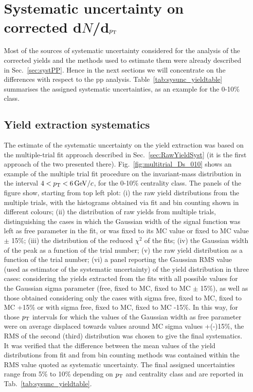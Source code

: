 \section{Systematic uncertainty on corrected d$N$/d$p_{\rm T}$}
\label{sec:systematics}
Most of the sources of systematic uncertainty considered for the analysis 
of the corrected yields and the methods used to estimate them were already described in Sec.~\ref{sec:systPP}. 
Hence in the next sections we will concentrate on the differences with respect to the 
pp analysis. Table~\ref{tab:sysunc_yieldtable} summarises the 
assigned systematic uncertainties, as an example for the 0-10\% class. 

\subsection{Yield extraction systematics}
\label{sec:YieldExsystAA}
The estimate of the systematic uncertainty on the yield extraction
was based on the multiple-trial fit approach described in Sec.~\ref{sec:RawYieldSyst}
(it is the first approach of the two presented there).
Fig.~\ref{fig:multitrial_Ds_010} shows an example of the multiple trial fit procedure on the invariant-mass
distribution in the interval $4 < p_{\rm T} < 6 \, \mathrm{GeV}/c$, for the 0-10\% centrality class.
The panels of the figure show, starting from top left plot:
(i) the raw yield distributions from the multiple trials,
with the histograms obtained via fit and bin counting shown
in different colours; (ii) the distribution of raw yields from multiple 
trials, distinguishing the cases in which the Gaussian width of the signal function was left as free parameter 
in the fit, or was fixed to its MC value or fixed to MC value $\pm$ 15\%; 
(iii) the distribution of the reduced $\chi^{2}$ of the fits; 
(iv) the Gaussian width of the peak as a function of the trial 
number; (v) the raw yield distribution as a 
function of the trial number; (vi) a panel reporting the Gaussian RMS value (used as
estimator of the systematic uncertainty) of the yield distribution
in three cases: considering the yields extracted from the fits with 
all possible values for the Gaussian sigma parameter (free, fixed to MC, fixed to MC $\pm$ 15\%), 
as well as those obtained considering only the cases with sigma free, fixed to MC, fixed to 
MC +15\% or with sigma free, fixed to MC, fixed to MC -15\%. 
In this way, for those $p_{\rm T}$ intervals for which the values 
of the Gaussian width as free parameter were on average displaced towards 
values around MC sigma values +(-)15\%, the RMS of the second (third) 
distribution was chosen to give the final systematics. 
It was verified that the difference between the mean values of the yield distributions from fit
and from bin counting methods was contained within the RMS value quoted 
as systematic uncertainty.
The final assigned uncertainties range from 5\% to 10\% depending on $p_{\rm T}$ and
centrality class and are reported in Tab.~\ref{tab:sysunc_yieldtable}. 




